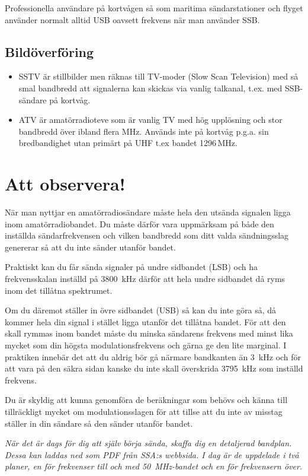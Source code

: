 Professionella användare på kortvågen så som maritima sändarstationer och flyget använder normalt alltid USB oavsett frekvens när man använder SSB.

\subsection{Bildöverföring}

\begin{itemize}
	\item SSTV är stillbilder men räknas till TV-moder (Slow Scan Television) med så smal bandbredd att signalerna kan skickas via vanlig talkanal, t.ex. med SSB-sändare på kortvåg.
	\item ATV är amatörradioteve som är vanlig TV med hög upplösning och stor bandbredd över ibland flera MHz. Används inte på kortvåg p.g.a. sin bredbandighet utan primärt på UHF t.ex bandet  1296\,MHz.
\end{itemize}


\section{Att observera!}

När man nyttjar en amatörradiosändare måste hela den utsända signalen ligga inom amatörradiobandet. Du måste därför vara uppmärksam på både den inställda sändarfrekvensen och vilken bandbredd som ditt valda sändningsslag genererar så att du inte sänder utanför bandet.

Praktiskt kan du får sända signaler på undre sidbandet (LSB) och ha frekvensskalan inställd på \SI{3800}{kHz} därför att hela undre sidbandet då ryms inom det tillåtna spektrumet. 

Om du däremot ställer in övre sidbandet (USB) så kan du inte göra så, då kommer hela din signal i stället ligga utanför det tillåtna bandet. För att den skall rymmas inom bandet måste du minska sändarens frekvens med minst lika mycket som din högsta modulationsfrekvens och gärna ge den lite marginal. I praktiken innebär det att du aldrig bör gå närmare bandkanten än \SI{3}{kHz} och för att vara på den säkra sidan kanske du inte skall överskrida \SI{3795}{kHz} som inställd frekvens.

Du är skyldig att kunna genomföra de beräkningar som behövs och känna till tillräckligt mycket om modulationsslagen för att tillse att du inte av misstag ställer in din sändare så den sänder utanför bandet.

\emph{När det är dags för dig att själv börja sända, skaffa dig en detaljerad bandplan. Dessa kan laddas ned som PDF från SSA:s webbsida. I dag är de uppdelade i två planer, en för frekvenser till och med \SI{50}{MHz}-bandet och en för frekvensern över.}


